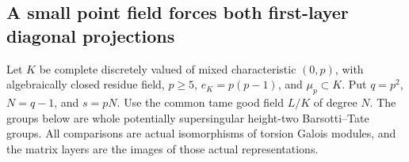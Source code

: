 \subsection{A small point field forces both first-layer diagonal projections}

Let \(K\) be complete discretely valued of mixed characteristic
\((0,p)\), with algebraically closed residue field,
\(p\ge5\), \(e_K=p(p-1)\), and \(\mu_p\subset K\).
Put \(q=p^2\), \(N=q-1\), and \(s=pN\).
Use the common tame good field \(L/K\) of degree \(N\).
The groups below are whole potentially supersingular
height-two Barsotti--Tate groups. All comparisons are actual
isomorphisms of torsion Galois modules, and the matrix layers
are the images of those actual representations.

